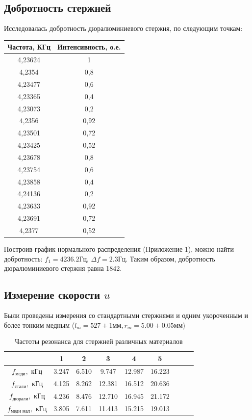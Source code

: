 \documentclass[a4paper]{article}
\begin{document}
\subsection{Добротность стержней}
Исследовалась добротность дюралюминиевого стержня, по следующим точкам:
\begin{table}[!ht]
	\centering
	\begin{tabular}{|c|c|}
		\hline
		Частота, КГц & Интенсивность, о.е. \\ \hline
		4,23624 & 1 \\ \hline
		4,2354 & 0,8 \\ \hline
		4,23477 & 0,6 \\ \hline
		4,23365 & 0,4 \\ \hline
		4,23073 & 0,2 \\ \hline
		4,2356 & 0,92 \\ \hline
		4,23501 & 0,72 \\ \hline
		4,23425 & 0,52 \\ \hline
		4,23678 & 0,8 \\ \hline
		4,23754 & 0,6 \\ \hline
		4,23858 & 0,4 \\ \hline
		4,24136 & 0,2 \\ \hline
		4,23633 & 0,92 \\ \hline
		4,23691 & 0,72 \\ \hline
		4,2377 & 0,52 \\ \hline
	\end{tabular}
\end{table}
Построив график нормального распределения (Приложение 1), можно найти добротность:
$f_1 = 4236.2 Гц$, $\Delta f = 2.3 Гц$. Таким образом, добротность дюралюминиевого стержня равна 1842.

\subsection{Измерение скорости $u$} 
Были проведены измерения со стандартными стержнями и одним укороченным и более тонким медным ($l_m=527\pm1 мм, r_m=5.00\pm0.05 мм$)
\begin{table}[h]
\caption{Частоты резонанса для стержней различных материалов} 
\centering
\begin{tabular}{|c|c|c|c|c|c|c|c|c|}
\hline
& 1 & 2 & 3 & 4 & 5 \\
\hline
$f_\text{меди},$ кГц & 3.247 & 6.510 & 9.747 & 12.987 & 16.223 \\
\hline
$f_\text{стали},$ кГц & 4.125 & 8.262 & 12.381 & 16.512 & 20.636 \\
\hline
$f_\text{дюрали},$ кГц & 4.236 & 8.476 & 12.710 & 16.945 & 21.172\\
\hline
$f_\text{меди мал},$ кГц & 3.805 & 7.611 & 11.413 & 15.215 & 19.013 \\
\hline
\end{tabular}
\end{table}
\end{document}
